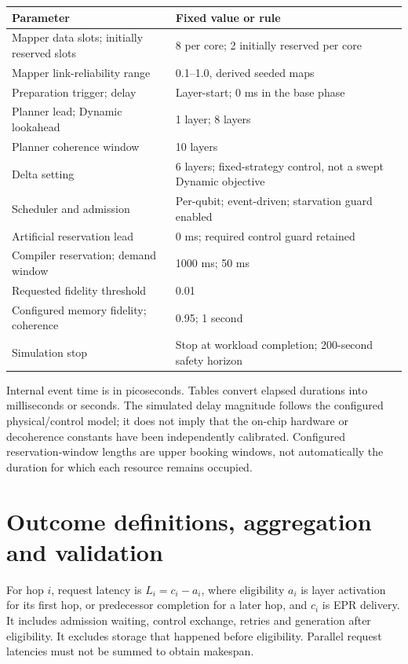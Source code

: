 \documentclass[10pt,a4paper,oneside]{report}
\begin{document}
\begin{center}\small
\begin{tabular}{ll}\toprule
Parameter & Fixed value or rule\\\midrule
Mapper data slots; initially reserved slots & 8 per core; 2 initially reserved per core\\
Mapper link-reliability range & 0.1--1.0, derived seeded maps\\
Preparation trigger; delay & Layer-start; 0 ms in the base phase\\
Planner lead; Dynamic lookahead & 1 layer; 8 layers\\
Planner coherence window & 10 layers\\
Delta setting & 6 layers; fixed-strategy control, not a swept Dynamic objective\\
Scheduler and admission & Per-qubit; event-driven; starvation guard enabled\\
Artificial reservation lead & 0 ms; required control guard retained\\
Compiler reservation; demand window & 1000 ms; 50 ms\\
Requested fidelity threshold & 0.01\\
Configured memory fidelity; coherence & 0.95; 1 second\\
Simulation stop & Stop at workload completion; 200-second safety horizon\\\bottomrule
\end{tabular}\end{center}

Internal event time is in picoseconds. Tables convert elapsed durations into milliseconds or seconds. The simulated delay magnitude follows the configured physical/control model; it does not imply that the on-chip hardware or decoherence constants have been independently calibrated. Configured reservation-window lengths are upper booking windows, not automatically the duration for which each resource remains occupied.

\clearpage
\section{Outcome definitions, aggregation and validation}
For hop $i$, request latency is $L_i=c_i-a_i$, where eligibility $a_i$ is layer activation for its first hop, or predecessor completion for a later hop, and $c_i$ is EPR delivery. It includes admission waiting, control exchange, retries and generation after eligibility. It excludes storage that happened before eligibility. Parallel request latencies must not be summed to obtain makespan.
\end{document}
